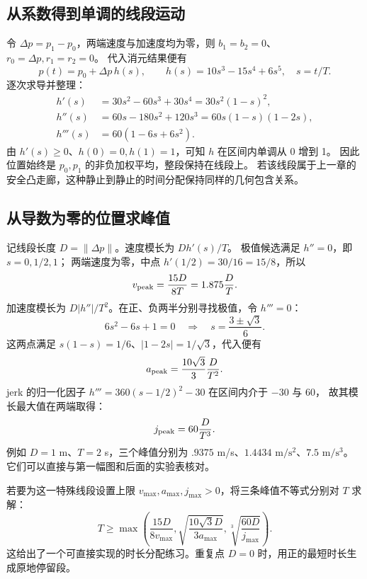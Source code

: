 \subsection{从系数得到单调的线段运动}
令 $\Delta p=p_1-p_0$，两端速度与加速度均为零，则 $b_1=b_2=0$、$r_0=\Delta p,r_1=r_2=0$。
代入消元结果便有
\begin{equation}
p(t)=p_0+\Delta p\,h(s),\qquad
h(s)=10s^3-15s^4+6s^5,\quad s=t/T.
\end{equation}
逐次求导并整理：
\begin{align}
h'(s)&=30s^2-60s^3+30s^4=30s^2(1-s)^2,\\
h''(s)&=60s-180s^2+120s^3=60s(1-s)(1-2s),\\
h'''(s)&=60(1-6s+6s^2).
\end{align}
由 $h'(s)\geq0$、$h(0)=0,h(1)=1$，可知 $h$ 在区间内单调从 0 增到 1。
因此位置始终是 $p_0,p_1$ 的非负加权平均，整段保持在线段上。
若该线段属于上一章的安全凸走廊，这种静止到静止的时间分配保持同样的几何包含关系。

\subsection{从导数为零的位置求峰值}
记线段长度 $D=\|\Delta p\|$。速度模长为 $D h'(s)/T$。
极值候选满足 $h''=0$，即 $s=0,1/2,1$；
两端速度为零，中点 $h'(1/2)=30/16=15/8$，所以
\begin{equation}v_{\rm peak}=\frac{15D}{8T}=1.875\frac DT.\end{equation}
加速度模长为 $D|h''|/T^2$。在正、负两半分别寻找极值，令 $h'''=0$：
\begin{equation}
6s^2-6s+1=0\quad\Longrightarrow\quad s=\frac{3\pm\sqrt3}{6}.
\end{equation}
这两点满足 $s(1-s)=1/6$、$|1-2s|=1/\sqrt3$，代入便有
\begin{equation}a_{\rm peak}=\frac{10\sqrt3}{3}\frac D{T^2}.\end{equation}
jerk 的归一化因子 $h'''=360(s-1/2)^2-30$ 在区间内介于 $-30$ 与 60，
故其模长最大值在两端取得：
\begin{equation}j_{\rm peak}=60\frac D{T^3}.\end{equation}
例如 $D=1$ m、$T=2$ s，三个峰值分别为 $.9375$ m/s、$1.4434$ $\mathrm{m/s^2}$、$7.5$ $\mathrm{m/s^3}$。
它们可以直接与第一幅图和后面的实验表核对。

若要为这一特殊线段设置上限 $v_{\max},a_{\max},j_{\max}>0$，将三条峰值不等式分别对 $T$ 求解：
\begin{equation}
T\geq\max\left(\frac{15D}{8v_{\max}},
\sqrt{\frac{10\sqrt3 D}{3a_{\max}}},
\sqrt[3]{\frac{60D}{j_{\max}}}\right).
\end{equation}
这给出了一个可直接实现的时长分配练习。重复点 $D=0$ 时，用正的最短时长生成原地停留段。

